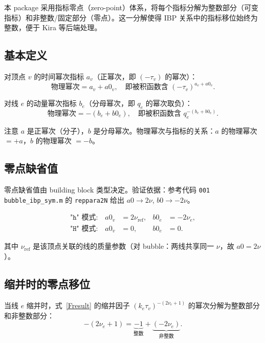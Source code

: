 ﻿\documentclass[a4paper,11pt]{article}
\begin{document}
本 package 采用指标零点（zero-point）体系，将每个指标分解为整数部分（可变指标）和非整数/固定部分（零点）。这一分解使得 IBP 关系中的指标移位始终为整数，便于 Kira 等后端处理。

\subsection{基本定义}

对顶点 $v$ 的时间幂次指标 $a_v$（正幂次，即 $(-\tau_v)$ 的幂次）：
\begin{equation}
  \text{物理幂次} = a_v + a0_v, \quad \text{即被积函数含 } (-\tau_v)^{a_v + a0_v}.
  \label{adecomp}
\end{equation}

对线 $e$ 的动量幂次指标 $b_e$（分母幂次，即 $q_e$ 的幂次取负）：
\begin{equation}
  \text{物理幂次} = -(b_e + b0_e), \quad \text{即被积函数含 } q_e^{-(b_e + b0_e)}.
  \label{bdecomp}
\end{equation}

注意 $a$ 是正幂次（分子），$b$ 是分母幂次。物理幂次与指标的关系：$a$ 的物理幂次 $= +a$，$b$ 的物理幂次 $= -b$。

\subsection{零点缺省值}

零点缺省值由 building block 类型决定。验证依据：参考代码 \texttt{001 bubble\_ibp\_sym.m} 的 \texttt{reppara2N} 给出 $a0 \to 2\nu$, $b0 \to -2\nu$。

\begin{align}
  \texttt{"h" 模式:} \quad a0_v &= 2\nu_{\text{ref}}, & b0_e &= -2\nu_e, \label{zeroHmode} \\
  \texttt{"H" 模式:} \quad a0_v &= 0, & b0_e &= 0. \label{zeroHmodeH}
\end{align}

其中 $\nu_{\text{ref}}$ 是该顶点关联的线的质量参数（对 bubble：两线共享同一 $\nu$，故 $a0 = 2\nu$）。

\subsection{缩并时的零点移位}

当线 $e$ 缩并时，式~\eqref{Fresult} 的缩并因子 $(k_e \tau_v)^{-(2\nu_e+1)}$ 的幂次分解为整数部分和非整数部分：
\begin{equation}
  -(2\nu_e + 1) = \underbrace{-1}_{\text{整数}} + \underbrace{(-2\nu_e)}_{\text{非整数}}.
  \label{shrinkDecomp}
\end{equation}
\end{document}
